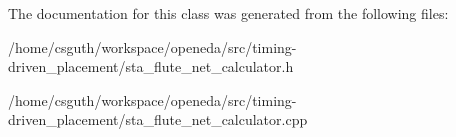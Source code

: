 The documentation for this class was generated from the following files\-:\begin{DoxyCompactItemize}
\item 
/home/csguth/workspace/openeda/src/timing-\/driven\-\_\-placement/sta\-\_\-flute\-\_\-net\-\_\-calculator.\-h\item 
/home/csguth/workspace/openeda/src/timing-\/driven\-\_\-placement/sta\-\_\-flute\-\_\-net\-\_\-calculator.\-cpp\end{DoxyCompactItemize}
